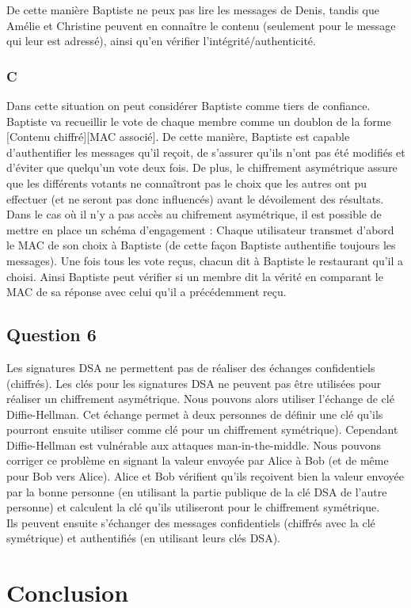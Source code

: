 \documentclass[a4paper, 11pt, oneside]{article}
\begin{document}
De cette manière Baptiste ne peux pas lire les messages de Denis, tandis que Amélie et Christine peuvent en connaître le contenu (seulement pour le message qui leur est adressé), ainsi qu'en vérifier l'intégrité/authenticité.

\subsubsection{C}

Dans cette situation on peut considérer Baptiste comme tiers de confiance. Baptiste va recueillir le vote de chaque membre comme un doublon de la forme [Contenu chiffré][MAC associé]. De cette manière, Baptiste est capable d'authentifier les messages qu'il reçoit, de s'assurer qu'ils n'ont pas été modifiés et d'éviter que quelqu'un vote deux fois. De plus, le chiffrement asymétrique assure que les différents votants ne connaîtront pas le choix que les autres ont pu effectuer (et ne seront pas donc influencés) avant le dévoilement des résultats.\\[5pt]
Dans le cas où il n'y a pas accès au chifrement asymétrique, il est possible de mettre en place un schéma d'engagement : Chaque utilisateur transmet d'abord le MAC de son choix à Baptiste (de cette façon Baptiste authentifie toujours les messages). Une fois tous les vote reçus, chacun dit à Baptiste le restaurant qu'il a choisi. Ainsi Baptiste peut vérifier si un membre dit la vérité en comparant le MAC de sa réponse avec celui qu'il a précédemment reçu.

\subsection{Question 6}

Les signatures DSA ne permettent pas de réaliser des échanges confidentiels (chiffrés). Les clés pour les signatures DSA ne peuvent pas être utilisées pour réaliser un chiffrement asymétrique.
Nous pouvons alors utiliser l'échange de clé Diffie-Hellman. Cet échange permet à deux personnes de définir une clé qu'ils pourront ensuite utiliser comme clé pour un chiffrement symétrique).
Cependant Diffie-Hellman est vulnérable aux attaques man-in-the-middle. Nous pouvons corriger ce problème en signant la valeur envoyée par Alice à Bob (et de même pour Bob vers Alice). Alice et Bob vérifient qu'ils reçoivent bien la valeur envoyée par la bonne personne (en utilisant la partie publique de la clé DSA de l'autre personne) et calculent la clé qu'ils utiliseront pour le chiffrement symétrique.
\\
Ils peuvent ensuite s'échanger des messages confidentiels (chiffrés avec la clé symétrique) et authentifiés (en utilisant leurs clés DSA).

\section*{Conclusion}
\end{document}
